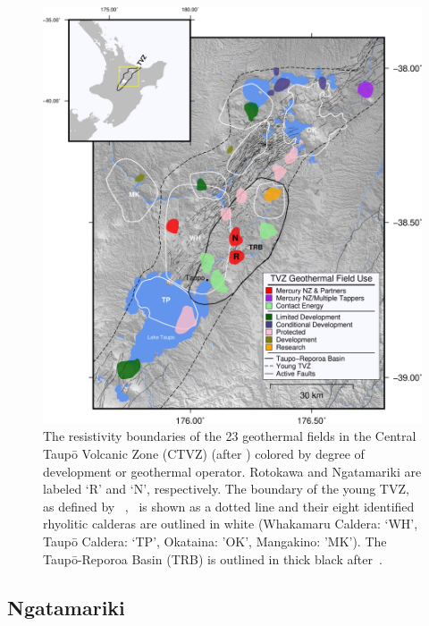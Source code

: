 \begin{figure}[h!]
\begin{center}
\includegraphics[width=1.00\columnwidth]{Chapter_1_Intro/figures/Geothermal_fields_TVZ_w_usage/TVZ_geothermal_overview_large}
\caption[Location of the geothermal fields in the \acrshort{TVZ}]{{
The resistivity boundaries of the 23 geothermal fields in the Central
Taup\={o} Volcanic Zone (CTVZ) (after \protect\citet{Bibby_1995}) colored by degree
of development or geothermal operator. Rotokawa and Ngatamariki are
labeled `R' and `N', respectively. The boundary of the young \acrshort{TVZ}, as
defined by~\protect\citet{Wilson_1995} ,~ is shown as a dotted line and their
eight identified rhyolitic calderas are outlined in white (Whakamaru
Caldera: `WH', Taup\={o} Caldera: `TP', Okataina: 'OK', Mangakino: 'MK'). The Taup\={o}-Reporoa
Basin (TRB) is outlined in thick black after~\protect\citet{Downs_2014}.~~
{\label{764580}}%
}}
\end{center}
\end{figure}

\subsection{Ngatamariki}
